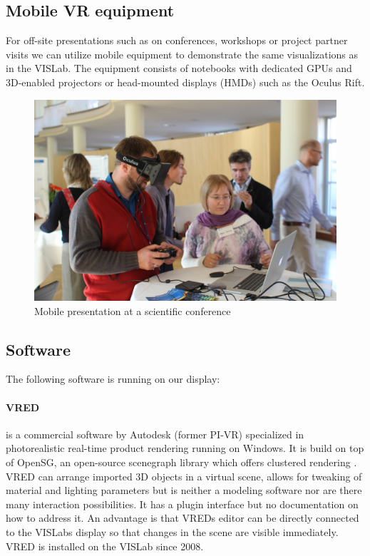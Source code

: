 \subsection{Mobile VR equipment}
\label{mobile-vr-equipment}

For off-site presentations such as on conferences, workshops or project
partner visits we can utilize mobile equipment to demonstrate the same
visualizations as in the VISLab. The equipment consists of notebooks
with dedicated GPUs and 3D-enabled projectors or head-mounted displays
(HMDs) such as the Oculus Rift.

\begin{figure}
  \includegraphics[width=\linewidth]{images/rift.jpg}
\caption{Mobile presentation at a scientific conference}
\label{fig:rift}
\end{figure}

\subsection{Software}
\label{software}

The following software is running on our display:

\paragraph{VRED}
is a commercial software by Autodesk (former PI-VR) specialized in
photorealistic real-time product rendering running on Windows. It is
build on top of OpenSG, an open-source scenegraph library which offers
clustered rendering \cite{opensg}. VRED can arrange imported 3D
objects in a virtual scene, allows for tweaking of material and lighting
parameters but is neither a modeling software nor are there many
interaction possibilities. It has a plugin interface but no
documentation on how to address it. An advantage is that VREDs editor
can be directly connected to the VISLabs display so that changes in the
scene are visible immediately. VRED is installed on the VISLab since
2008.

